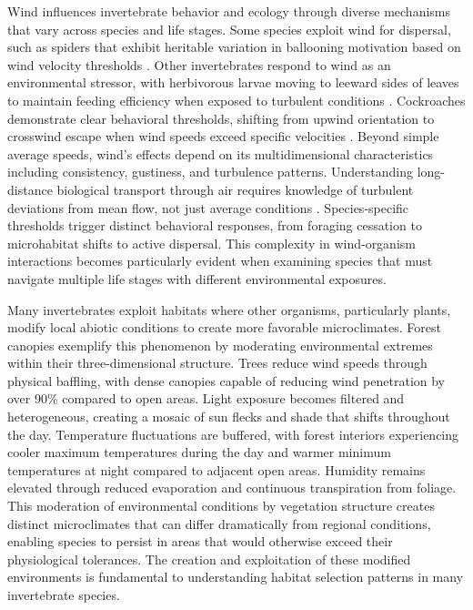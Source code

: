 Wind influences invertebrate behavior and ecology through diverse mechanisms that vary across species and life stages. Some species exploit wind for dispersal, such as spiders that exhibit heritable variation in ballooning motivation based on wind velocity thresholds \citep{bonteHeritabilitySpiderBallooning2007}. Other invertebrates respond to wind as an environmental stressor, with herbivorous larvae moving to leeward sides of leaves to maintain feeding efficiency when exposed to turbulent conditions \citep{leonardExposureWindAlters2016}. Cockroaches demonstrate clear behavioral thresholds, shifting from upwind orientation to crosswind escape when wind speeds exceed specific velocities \citep{bellSearchAnemotacticOrientation1979}. Beyond simple average speeds, wind's effects depend on its multidimensional characteristics including consistency, gustiness, and turbulence patterns. Understanding long-distance biological transport through air requires knowledge of turbulent deviations from mean flow, not just average conditions \citep{nathanLongdistanceBiologicalTransport2005}. Species-specific thresholds trigger distinct behavioral responses, from foraging cessation to microhabitat shifts to active dispersal. This complexity in wind-organism interactions becomes particularly evident when examining species that must navigate multiple life stages with different environmental exposures.

Many invertebrates exploit habitats where other organisms, particularly plants, modify local abiotic conditions to create more favorable microclimates. Forest canopies exemplify this phenomenon by moderating environmental extremes within their three-dimensional structure. Trees reduce wind speeds through physical baffling, with dense canopies capable of reducing wind penetration by over 90\% compared to open areas. Light exposure becomes filtered and heterogeneous, creating a mosaic of sun flecks and shade that shifts throughout the day. Temperature fluctuations are buffered, with forest interiors experiencing cooler maximum temperatures during the day and warmer minimum temperatures at night compared to adjacent open areas. Humidity remains elevated through reduced evaporation and continuous transpiration from foliage. This moderation of environmental conditions by vegetation structure creates distinct microclimates that can differ dramatically from regional conditions, enabling species to persist in areas that would otherwise exceed their physiological tolerances. The creation and exploitation of these modified environments is fundamental to understanding habitat selection patterns in many invertebrate species.

